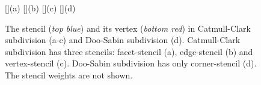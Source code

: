 \documentclass[twocolumn]{article}
\begin{document}
\begin{figure}[tb]
  \centering
  []{(a)}
  []{(b)}
  []{(c)}
  []{(d)}
  \caption{The stencil ({\itshape top blue}) and its 
           vertex ({\itshape bottom red}) in 
           Catmull-Clark subdivision (a-c)
           and Doo-Sabin subdivision (d). Catmull-Clark
           subdivision has three stencils: facet-stencil (a), 
           edge-stencil (b) and vertex-stencil (c). 
           Doo-Sabin subdivision has only corner-stencil (d).
           The stencil weights are not shown.}
  \label{fig:RefMap}
\end{figure}







\end{document}
